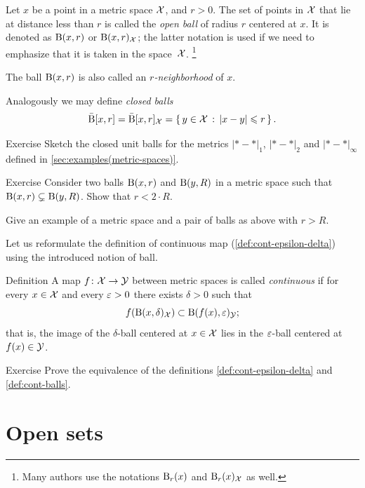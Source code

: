 Let $x$ be a point in a metric space $\mathcal{X}$,
and $r>0$.
The set of points in $\mathcal{X}$ that lie at distance less than $r$ is called the \emph{open ball} of radius $r$ centered at $x$.
It is denoted as $\mathrm{B}(x,r)$ 
or $\mathrm{B}(x,r)_{\mathcal{X}}$;
the latter notation is used if we need to emphasize that it is taken in the space~$\mathcal{X}$.%
\footnote{Many authors use the notations $\mathrm{B}_r(x)$ and $\mathrm{B}_r(x)_{\mathcal{X}}$ as well.}

The ball $\mathrm{B}(x,r)$ is also called an \emph{$r$-neighborhood} of $x$.

Analogously we may define {}\emph{closed balls} 
\[\bar{\mathrm{B}}[x,r]=\bar{\mathrm{B}}[x,r]_{\mathcal{X}}=\left\{\,{y\in \mathcal{X}}\,:\,{|x-y|\leqslant r}\,\right\}.\] 

\begin{thm}{Exercise}\label{ex:d1+d2+dinfty-balls}
Sketch the closed unit balls for the metrics $|{*}-{*}|_1$, $|{*}-{*}|_2$ and $|{*}-{*}|_\infty$ defined in \ref{sec:examples(metric-spaces)}.
\end{thm}

\begin{thm}{Exercise}\label{ex:r<2R}
Consider two balls $\mathrm{B}(x,r)$ and $\mathrm{B}(y,R)$ in a metric space such that $\mathrm{B}(x,r)\subsetneq \mathrm{B}(y,R)$.
Show that $r<2\cdot R$.

Give an example of a metric space and a pair of balls as above with $r> R$.
\end{thm}

Let us reformulate the definition of continuous map (\ref{def:cont-epsilon-delta}) using the introduced notion of ball.

\begin{thm}{Definition}\label{def:cont-balls}
A map $f\colon\mathcal{X}\to\mathcal{Y}$ between metric spaces is called \emph{continuous} if for every $x\in \mathcal{X}$ and every $\varepsilon>0$ there exists $\delta>0$ such that
\[f(\mathrm{B}(x,\delta)_{\mathcal{X}})\subset\mathrm{B}(f(x),\varepsilon)_{\mathcal{Y}};\]
that is, the image of the $\delta$-ball centered at $x\in\mathcal{X}$ lies in the $\varepsilon$-ball centered at $f(x)\in\mathcal{Y}$.

\end{thm}

\begin{thm}{Exercise}\label{ex:def:cont-epsilon-delta=def:cont-balls}
Prove the equivalence of the definitions \ref{def:cont-epsilon-delta} and \ref{def:cont-balls}.
\end{thm}



\section{Open sets}

